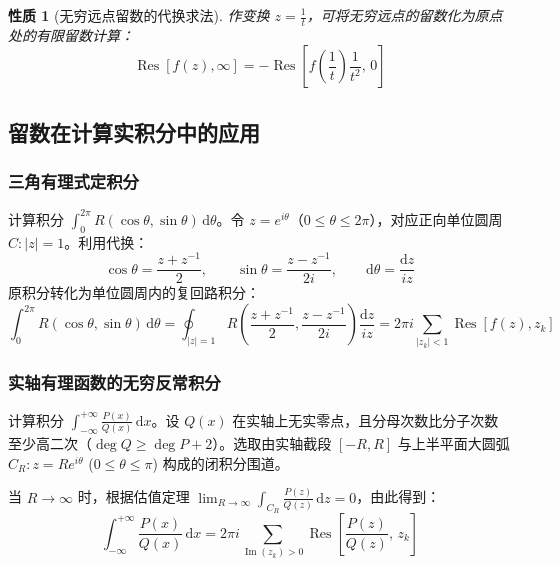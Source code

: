 \documentclass[11pt,a4paper,fontset=fandol]{ctexart}
\newtheorem{property}[theorem]{性质}
\theoremstyle{remark}
\begin{document}
\begin{property}[无穷远点留数的代换求法]
作变换 $z = \frac{1}{t}$，可将无穷远点的留数化为原点处的有限留数计算：
\begin{equation}
    \operatorname{Res}[f(z), \infty] = -\operatorname{Res}\left[ f\left(\frac{1}{t}\right)\frac{1}{t^2},\, 0 \right]
\end{equation}
\end{property}

\subsection{留数在计算实积分中的应用}

\subsubsection{三角有理式定积分}
计算积分 $\int_0^{2\pi} R(\cos\theta, \sin\theta)\,\mathrm{d}\theta$。令 $z = e^{i\theta}$（$0 \le \theta \le 2\pi$），对应正向单位圆周 $C: |z| = 1$。利用代换：
\begin{equation}
    \cos\theta = \frac{z + z^{-1}}{2}, \qquad \sin\theta = \frac{z - z^{-1}}{2i}, \qquad \mathrm{d}\theta = \frac{\mathrm{d}z}{iz}
\end{equation}
原积分转化为单位圆周内的复回路积分：
\begin{equation}
    \int_0^{2\pi} R(\cos\theta, \sin\theta)\,\mathrm{d}\theta = \oint_{|z|=1} R\left(\frac{z+z^{-1}}{2}, \frac{z-z^{-1}}{2i}\right)\frac{\mathrm{d}z}{iz} = 2\pi i \sum_{|z_k|<1} \operatorname{Res}[f(z), z_k]
\end{equation}

\subsubsection{实轴有理函数的无穷反常积分}
计算积分 $\int_{-\infty}^{+\infty} \frac{P(x)}{Q(x)}\,\mathrm{d}x$。设 $Q(x)$ 在实轴上无实零点，且分母次数比分子次数至少高二次（$\deg Q \ge \deg P + 2$）。选取由实轴截段 $[-R, R]$ 与上半平面大圆弧 $C_R: z = R e^{i\theta}$ ($0 \le \theta \le \pi$) 构成的闭积分围道。

当 $R \to \infty$ 时，根据估值定理 $\lim_{R \to \infty} \int_{C_R} \frac{P(z)}{Q(z)}\,\mathrm{d}z = 0$，由此得到：
\begin{equation}
    \int_{-\infty}^{+\infty} \frac{P(x)}{Q(x)}\,\mathrm{d}x = 2\pi i \sum_{\operatorname{Im}(z_k) > 0} \operatorname{Res}\left[\frac{P(z)}{Q(z)},\, z_k\right]
\end{equation}
\end{document}
